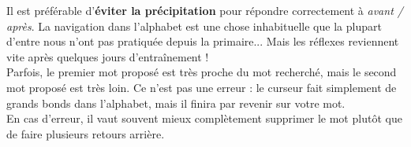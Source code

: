 \documentclass[french]{article}
\begin{document}
Il est préférable d'\textbf{éviter la précipitation} pour répondre correctement à \emph{avant / après}. La navigation dans l'alphabet est une chose inhabituelle que la plupart d'entre nous n'ont pas pratiquée depuis la primaire... Mais les réflexes reviennent vite après quelques jours d'entraînement !
\\

Parfois, le premier mot proposé est très proche du mot recherché, mais le second mot proposé est très loin. Ce n'est pas une erreur : le curseur fait simplement de grands bonds dans l'alphabet, mais il finira par revenir sur votre mot.
\\

En cas d'erreur, il vaut souvent mieux complètement supprimer le mot plutôt que de faire plusieurs retours arrière.
\end{document}
